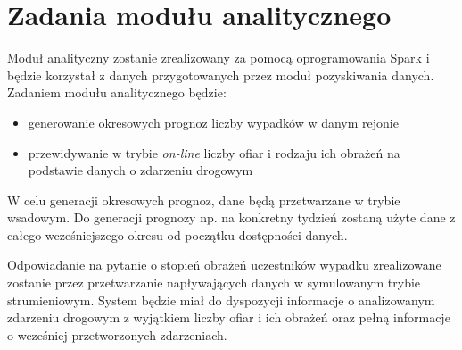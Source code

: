 \documentclass{article}
\begin{document}
\section{Zadania modułu analitycznego}

Moduł analityczny zostanie zrealizowany za pomocą oprogramowania Spark i będzie korzystał z danych przygotowanych przez moduł pozyskiwania danych. Zadaniem modułu analitycznego będzie:
\begin{itemize}
    \item generowanie okresowych prognoz liczby wypadków w danym rejonie
    \item przewidywanie w trybie \emph{on-line} liczby ofiar i rodzaju ich obrażeń na podstawie danych o zdarzeniu drogowym
\end{itemize}

W celu generacji okresowych prognoz, dane będą przetwarzane w trybie wsadowym. Do generacji prognozy np. na konkretny tydzień zostaną użyte dane z całego wcześniejszego okresu od początku dostępności danych.

Odpowiadanie na pytanie o stopień obrażeń uczestników wypadku zrealizowane zostanie przez przetwarzanie napływających danych w symulowanym trybie strumieniowym. System będzie miał do dyspozycji informacje o analizowanym zdarzeniu drogowym z wyjątkiem liczby ofiar i ich obrażeń oraz pełną informacje o wcześniej przetworzonych zdarzeniach.
\end{document}
